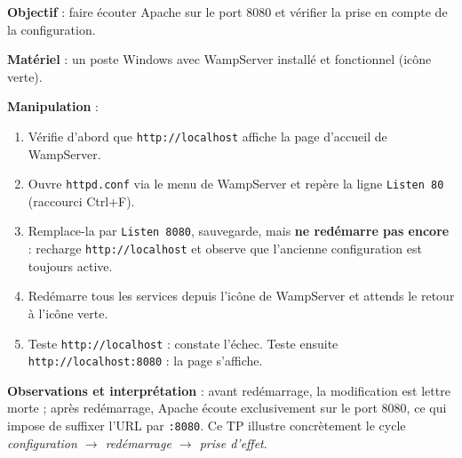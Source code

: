 \documentclass[11pt]{article}
\begin{document}
\begin{experience}
\textbf{Objectif} : faire écouter Apache sur le port 8080 et vérifier la prise en compte de la configuration.\par
\textbf{Matériel} : un poste Windows avec WampServer installé et fonctionnel (icône verte).\par
\textbf{Manipulation} :
\begin{enumerate}
  \item Vérifie d'abord que \texttt{http://localhost} affiche la page d'accueil de WampServer.
  \item Ouvre \texttt{httpd.conf} via le menu de WampServer et repère la ligne \texttt{Listen 80} (raccourci Ctrl+F).
  \item Remplace-la par \texttt{Listen 8080}, sauvegarde, mais \textbf{ne redémarre pas encore} : recharge \texttt{http://localhost} et observe que l'ancienne configuration est toujours active.
  \item Redémarre tous les services depuis l'icône de WampServer et attends le retour à l'icône verte.
  \item Teste \texttt{http://localhost} : constate l'échec. Teste ensuite \texttt{http://localhost:8080} : la page s'affiche.
\end{enumerate}
\textbf{Observations et interprétation} : avant redémarrage, la modification est lettre morte ; après redémarrage, Apache écoute exclusivement sur le port 8080, ce qui impose de suffixer l'URL par \texttt{:8080}. Ce TP illustre concrètement le cycle \emph{configuration $\rightarrow$ redémarrage $\rightarrow$ prise d'effet}.
\end{experience}
\end{document}
